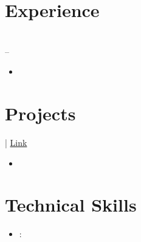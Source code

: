 \documentclass[10pt,a4paper]{article}
\providecommand{\VAR}[1]{}
\providecommand{\BLOCK}[1]{}
\begin{document}
\section*{Experience}
\BLOCK{for job in experience}
\noindent \textbf{\VAR{job.organization}} \hfill \VAR{job.location} \\
\textit{\VAR{job.title}} \hfill \VAR{job.start_date} -- \VAR{job.end_date or 'Present'}
\BLOCK{if job.bullets and job.bullets|length > 0}
\begin{itemize}[leftmargin=1.5em, itemsep=1pt, parsep=0pt, topsep=2pt]
    \BLOCK{for bullet in job.bullets}
    \item \VAR{bullet.text}
    \BLOCK{endfor}
\end{itemize}
\BLOCK{endif}
\vspace{2pt}
\BLOCK{endfor}

\BLOCK{elif section_name == 'projects' and projects and projects|length > 0}
\section*{Projects}
\BLOCK{for proj in projects}
\noindent \textbf{\VAR{proj.name}} | \textit{\VAR{proj.tech_stack}}
\BLOCK{if proj.link and "http" in proj.link}\hfill \href{\VAR{proj.link}}{Link}\BLOCK{endif}

\BLOCK{if proj.bullets and proj.bullets|length > 0}
\begin{itemize}[leftmargin=1.5em, itemsep=1pt, parsep=0pt, topsep=2pt]
    \BLOCK{for bullet in proj.bullets}
    \item \VAR{bullet.text}
    \BLOCK{endfor}
\end{itemize}
\BLOCK{endif}
\vspace{2pt}
\BLOCK{endfor}

\BLOCK{elif section_name == 'technical_skills' and skills}
\section*{Technical Skills}
\begin{itemize}[leftmargin=1.5em, itemsep=2pt, parsep=0pt, topsep=2pt]
    \BLOCK{for skill_category, skill_list in skills.items()}
    \item \textbf{\VAR{skill_category | escape_latex}}: \VAR{skill_list}
    \BLOCK{endfor}
\end{itemize}

\BLOCK{endif}
\BLOCK{endfor}
\end{document}
